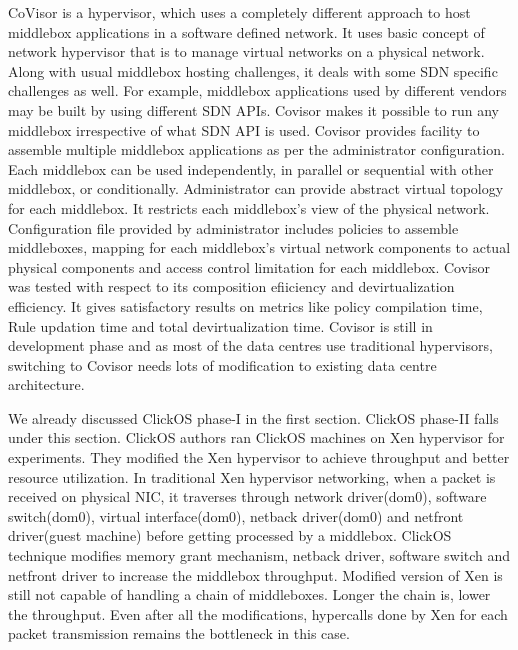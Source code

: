 \documentclass[a4paper,11pt]{report}
\begin{document}
CoVisor\cite{R5} is a hypervisor, which uses a completely different approach to host middlebox applications in a software defined network. It uses basic concept of network hypervisor that is to manage virtual networks on a physical network. Along with usual middlebox hosting challenges, it deals with some SDN specific challenges as well. For example, middlebox applications used by different vendors may be built by using different SDN APIs. Covisor makes it possible to run any middlebox irrespective of what SDN API is used. Covisor provides facility to assemble multiple middlebox applications as per the administrator configuration. Each middlebox can be used independently, in parallel or sequential with other middlebox, or conditionally. Administrator can provide abstract virtual topology for each middlebox. It restricts each middlebox's view of the physical network. Configuration file provided by administrator includes policies to assemble middleboxes, mapping for each middlebox's virtual network components to actual physical components and access control limitation for each middlebox. Covisor was tested with respect to its composition efiiciency and devirtualization efficiency. It gives satisfactory results on metrics like policy compilation time, Rule updation time and total devirtualization time. Covisor is still in development phase and as most of the data centres use traditional hypervisors, switching to Covisor needs lots of modification to existing data centre architecture. 

We already discussed ClickOS\cite{R1} phase-I in the first section. ClickOS phase-II falls under this section. ClickOS authors ran ClickOS machines on Xen hypervisor for experiments. They modified the Xen hypervisor to achieve throughput and better resource utilization. In traditional Xen hypervisor networking, when a packet is received on physical NIC, it traverses through network driver(dom0), software switch(dom0), virtual interface(dom0), netback driver(dom0) and netfront driver(guest machine) before getting processed by a middlebox. ClickOS technique modifies memory grant mechanism, netback driver, software switch and netfront driver to increase the middlebox throughput. Modified version of Xen is still not capable of handling a chain of middleboxes. Longer the chain is, lower the throughput. Even after all the modifications, hypercalls done by Xen for each packet transmission remains the bottleneck in this case.            
\end{document}
